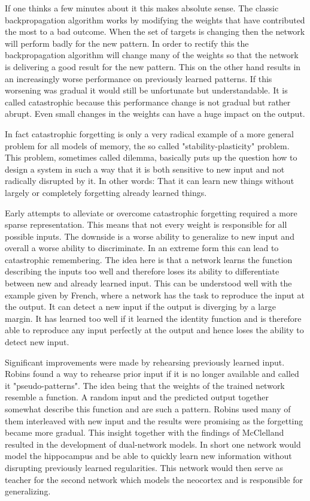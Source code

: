 \documentclass[12pt,twoside]{scrartcl}
\theoremstyle{plain}
\theoremstyle{definition}
\theoremstyle{remark}
\begin{document}
If one thinks a few minutes about it this makes absolute sense. The classic
backpropagation algorithm works by modifying the weights that have contributed
the most to a bad outcome. When the set of targets is changing then the network
will perform badly for the new pattern. In order to rectify this the backpropagation
algorithm will change many of the weights so that the network is delivering a
good result for the new pattern. This on the other hand results in an increasingly
worse performance on previously learned patterns. If this worsening was gradual
it would still be unfortunate but understandable. It is called catastrophic
because this performance change is not gradual but rather abrupt. Even small
changes in the weights can have a huge impact on the output.

In fact catastrophic forgetting is only a very radical example of a more general
problem for all models of memory, the so called "stability-plasticity" problem\cite{Grossberg1982}.
This problem, sometimes called dilemma, basically puts up the question how to
design a system in such a way that it is both sensitive to new input and not
radically disrupted by it. In other words: That it can learn new things
without largely or completely forgetting already learned things.

Early attempts to alleviate or overcome catastrophic forgetting required a more
sparse representation. This means that not every weight is responsible for all
possible inputs. The downside is a worse ability to generalize to new input
and overall a worse ability to discriminate. In an extreme form this can
lead to catastrophic remembering\cite{Sharkey1995}.
The idea here is that a
network learns the function describing the inputs too well and therefore
loses its ability to differentiate between new and already learned input.
This can be understood well with the example given by French\cite{French1999},
where a network has the task to reproduce the input at the output. It can detect
a new input if the output is diverging by a large margin. It has learned too well
if it learned the identity function and is therefore able to reproduce any
input perfectly at the output and hence loses the ability to detect new input.

Significant improvements were made by rehearsing previously learned input.
Robins\cite{Robins1995} found a way to rehearse prior input if it is no longer
available and called it "pseudo-patterns". The idea being that the weights
of the trained network resemble a function. A random input and the predicted
output together somewhat describe this function and are such a pattern. Robins
used many of them interleaved with new input and the results were promising
as the forgetting became more gradual. This insight together with
the findings of McClelland\cite{McClelland1995} resulted in the development
of dual-network models.
In short one network would model the hippocampus and be able to quickly learn new
information without disrupting previously learned regularities. This network
would then serve as teacher for the second network which models the neocortex
and is responsible for generalizing.
\end{document}
